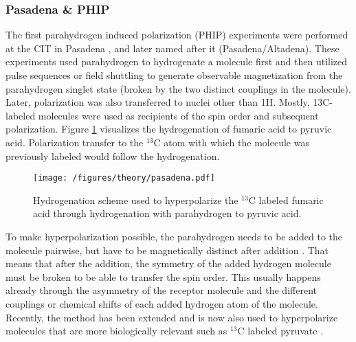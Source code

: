         \subsubsection{Pasadena \& PHIP}
        The first parahydrogen induced polarization (PHIP) experiments were performed at the CIT in Pasadena \cite{bowers_parahydrogen_1987-2}, and later named after it (Pasadena/Altadena). These experiments used parahydrogen to hydrogenate a molecule first and then utilized pulse sequences or field shuttling to generate observable magnetization from the parahydrogen singlet state (broken by the two distinct couplings in the molecule). Later, polarization was also transferred to nuclei other than 1H. Mostly, 13C-labeled molecules were used as recipients of the spin order and subsequent polarization. Figure \ref{fig:theory:pasadena} visualizes the hydrogenation of fumaric acid to pyruvic acid. Polarization transfer to the $^{13}$C atom with which the molecule was previously labeled would follow the hydrogenation.
        \begin{figure}
            \centering
            \texttt{[image: /figures/theory/pasadena.pdf]}
            \caption[Pasadena hyperpolarization]{Hydrogenation scheme used to hyperpolarize the $^{13}$C labeled fumaric acid through hydrogenation with parahydrogen to pyruvic acid.}
            \label{fig:theory:pasadena}
        \end{figure}
        To make hyperpolarization possible, the parahydrogen needs to be added to the molecule pairwise, but have to be magnetically distinct after addition \cite{eisenberg_parahydrogen-induced_1991}. That means that after the addition, the symmetry of the added hydrogen molecule must be broken to be able to transfer the spin order. This usually happens already through the asymmetry of the receptor molecule and the different couplings or chemical shifts of each added hydrogen atom of the molecule. Recently, the method has been extended and is now also used to hyperpolarize molecules that are more biologically relevant such as $^{13}$C labeled pyruvate \cite{cavallari_metabolic_2019}.
